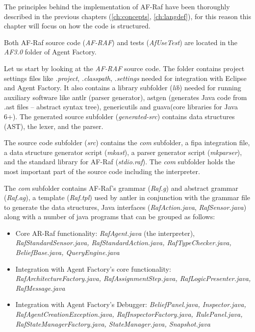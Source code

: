 \documentclass[a4paper,12pt,oneside,fleqn]{book} %
\begin{document}
{The principles behind the implementation of AF-Raf have been thoroughly
described in the previous chapters (\autoref{ch:concepts},
\autoref{ch:langdef}), for this reason this chapter will focus on how the
code is structured.

Both AF-Raf source code (\textit{AF-RAF}) and tests (\textit{AfUseTest})
are located in the \textit{AF3.0} folder of Agent Factory. 

Let us start by looking at the \textit{AF-RAF} source code. The folder
contains project settings files like \textit{.project},
\textit{.classpath}, \textit{.settings} needed for integration with Eclipse
and Agent Factory. It also contains a library subfolder (\textit{lib})
needed for running auxiliary software like antlr (parser generator), astgen
(generates Java code from .ast files -- abstract syntax tree), genericutils
and guava(core libraries for Java 6+). The generated source subfolder
(\textit{generated-src}) contains data structures (AST), the lexer, and the
parser. 

The source code subfolder (\textit{src}) contains the \textit{com}
subfolder, a fipa integration file, a data structure generator script
(\textit{mkast}), a parser generator script (\textit{mkparser}), and the
standard library for AF-Raf (\textit{stdio.raf}). The \textit{com}
subfolder holds the most important part of the source code including the
interpreter.

The \textit{com} subfolder contains AF-Raf's grammar (\textit{Raf.g}) and
abstract grammar (\textit{Raf.ag}), a template (\textit{Raf.tpl}) used by
antler in conjunction with the grammar file to generate the data
structures, Java interfaces (\textit{RafAction.java},
\textit{RafSensor.java}) along with a number of java programs that can be
grouped as follows: 

\begin{itemize}
  \item Core AR-Raf functionality: \textit{RafAgent.java} (the interpreter),
    \textit{RafStandardSensor.java, RafStandardAction.java, RafTypeChecker.java, BeliefBase.java, QueryEngine.java}
    \item Integration with Agent Factory's core
      functionality:
      \textit{RafArchitectureFactory.java, RafAssignmentStep.java,
      RafLogicPresenter.java, RafMessage.java }
    \item Integration with Agent Factory's Debugger: \textit{BeliefPanel.java,
      Inspector.java, RafAgentCreationException.java,
    RafInspectorFactory.java, RulePanel.java,
  RafStateManagerFactory.java, StateManager.java, Snapshot.java}
\end{itemize}

}
\end{document}
